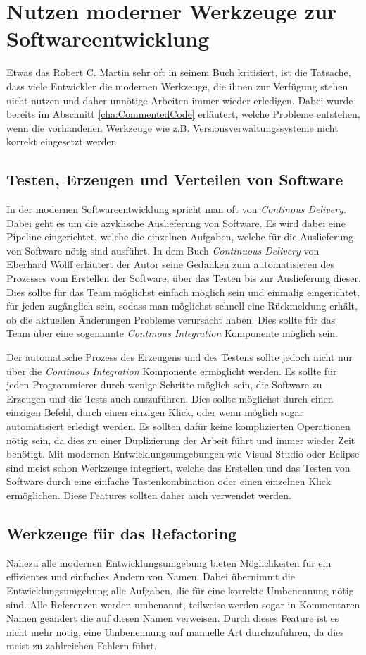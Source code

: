 \section{Nutzen moderner Werkzeuge zur Softwareentwicklung}
\label{cha:UsefullTools}
Etwas das Robert C. Martin sehr oft in seinem Buch kritisiert, ist die Tatsache, dass viele Entwickler die modernen Werkzeuge, die ihnen zur Verfügung stehen nicht nutzen und daher unnötige Arbeiten immer wieder erledigen. Dabei wurde bereits im Abschnitt \ref{cha:CommentedCode} erläutert, welche Probleme entstehen, wenn die vorhandenen Werkzeuge wie z.B. Versionsverwaltungssysteme nicht korrekt eingesetzt werden.

\subsection{Testen, Erzeugen und Verteilen von Software}
In der modernen Softwareentwicklung spricht man oft von \textit{Continous Delivery}. Dabei geht es um die azyklische Auslieferung von Software. Es wird dabei eine Pipeline eingerichtet, welche die einzelnen Aufgaben, welche für die Auslieferung von Software nötig sind ausführt. In dem Buch \textit{Continuous Delivery} von Eberhard Wolff erläutert der Autor seine Gedanken zum automatisieren des Prozesses vom Erstellen der Software, über das Testen bis zur Auslieferung dieser. Dies sollte für das Team möglichst einfach möglich sein und einmalig eingerichtet, für jeden zugänglich sein, sodass man möglichst schnell eine Rückmeldung erhält, ob die aktuellen Änderungen Probleme verursacht haben. Dies sollte für das Team über eine sogenannte \textit{Continous Integration} Komponente möglich sein.

\SuperPar Der automatische Prozess des Erzeugens und des Testens sollte jedoch nicht nur über die \textit{Continous Integration} Komponente ermöglicht werden. Es sollte für jeden Programmierer durch wenige Schritte möglich sein, die Software zu Erzeugen und die Tests auch auszuführen. Dies sollte möglichst durch einen einzigen Befehl, durch einen einzigen Klick, oder wenn möglich sogar automatisiert erledigt werden. Es sollten dafür keine komplizierten Operationen nötig sein, da dies zu einer Duplizierung der Arbeit führt und immer wieder Zeit benötigt. Mit modernen Entwicklungsumgebungen wie Visual Studio oder Eclipse sind meist schon Werkzeuge integriert, welche das Erstellen und das Testen von Software durch eine einfache Tastenkombination oder einen einzelnen Klick ermöglichen. Diese Features sollten daher auch verwendet werden.

\subsection{Werkzeuge für das Refactoring}
Nahezu alle modernen Entwicklungsumgebung bieten Möglichkeiten für ein effizientes und einfaches Ändern von Namen. Dabei übernimmt die Entwicklungsumgebung alle Aufgaben, die für eine korrekte Umbenennung nötig sind. Alle Referenzen werden umbenannt, teilweise werden sogar in Kommentaren Namen geändert die auf diesen Namen verweisen. Durch dieses Feature ist es nicht mehr nötig, eine Umbenennung auf manuelle Art durchzuführen, da dies meist zu zahlreichen Fehlern führt. 
